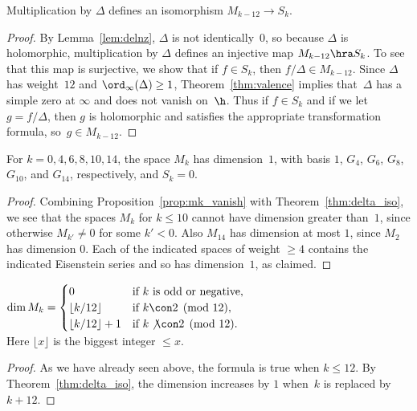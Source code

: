 \begin{theorem}\label{thm:delta_iso}
Multiplication by $\Delta$ defines an isomorphism $M_{k-12}\to S_k$.
\end{theorem}
\begin{proof}
By Lemma~\ref{lem:delnz}, $\Delta$ is not identically~$0$, so
because $\Delta$ is holomorphic, multiplication 
by $\Delta$ defines an injective map $M_{k-12}\hra S_k$.
To see that this map is surjective, we show that if $f\in S_k$, then 
$f/\Delta \in M_{k-12}$.
Since $\Delta$ has weight~$12$ and $\ord_\infty(\Delta)\geq 1$,
Theorem~\ref{thm:valence} implies that~$\Delta$ has a simple
zero at $\infty$ and does not vanish on~$\h$.
Thus if $f\in S_k$ and if we let $g=f/\Delta$, then $g$ is holomorphic
and satisfies the appropriate transformation formula, so~$g \in M_{k-12}$.
\end{proof}

\begin{corollary}
  For $k=0,4,6,8,10,14$, the space $M_k$ has dimension~$1$, with
  basis $1$, $G_4$, $G_6$, $G_8$, $G_{10}$, and $G_{14}$, respectively, and
  $S_k=0$.
\end{corollary}
\begin{proof}
  Combining Proposition~\ref{prop:mk_vanish} with
  Theorem~\ref{thm:delta_iso}, we see that the spaces $M_k$ for $k\leq
  10$ cannot have dimension greater than~$1$, since otherwise $M_{k'}\neq
  0$ for some $k'<0$.  Also $M_{14}$ has dimension at most $1$, since
  $M_2$ has dimension $0$.  Each of the indicated spaces of weight
  $\geq 4$ contains the indicated Eisenstein series and so has
  dimension~$1$, as claimed.
\end{proof}

\begin{corollary}\label{cor:dim1}
$\dim M_k = \begin{cases}
   0 & \text{if }k\text{ is odd or negative}, \\ 
   \lfloor{} k/12 \rfloor{} & \text{if } k\con 2\pmod{12},\\
   \lfloor{} k/12 \rfloor{}+1 & \text{if } k\not\con 2\pmod{12}.
\end{cases}
$\\
Here $\lfloor{}x \rfloor{}$ is the biggest integer $\leq x$.
\end{corollary}
\begin{proof}
As we have already seen above, the formula is true when $k\leq 12$.
By Theorem~\ref{thm:delta_iso}, the dimension increases by $1$
when~$k$ is replaced by $k+12$.
\end{proof}

